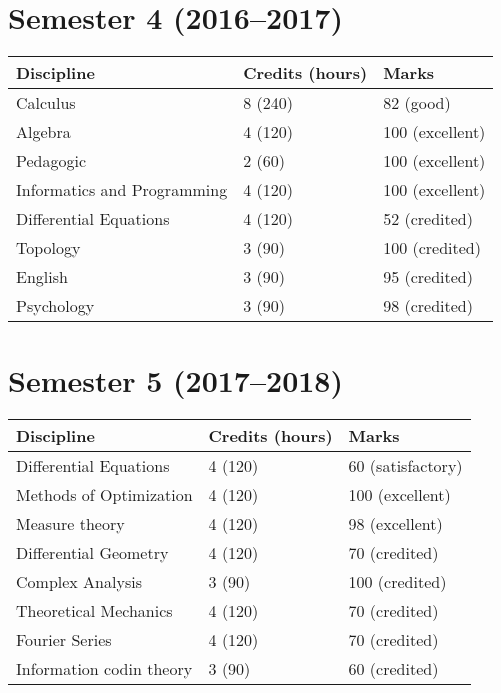 \documentclass[10pt]{extarticle}
\begin{document}

\section*{Semester 4 (2016--2017)}

\begin{tabularx}{\textwidth}{ | X | l | l | }

\hline
    \textbf{Discipline}              & \textbf{Credits (hours)} & \textbf{Marks} \\
\hline
    Calculus & 8 (240) & 82 (good) \\
    Algebra & 4 (120) & 100 (excellent) \\
    Pedagogic & 2 (60) & 100 (excellent) \\
    Informatics and Programming & 4 (120) & 100 (excellent) \\
\hline
    Differential Equations & 4 (120) & 52 (credited)  \\
    Topology               & 3 (90)  & 100 (credited) \\
    English                & 3 (90)  & 95 (credited)  \\
    Psychology             & 3 (90)  & 98 (credited)  \\
\hline

\end{tabularx}


\section*{Semester 5 (2017--2018)}

\begin{tabularx}{\textwidth}{ | X | l | l | }

\hline
    \textbf{Discipline}              & \textbf{Credits (hours)} & \textbf{Marks} \\
\hline
    Differential Equations  & 4 (120) & 60  (satisfactory) \\
    Methods of Optimization & 4 (120) & 100 (excellent)    \\
    Measure theory          & 4 (120) & 98  (excellent)    \\
\hline
    Differential Geometry    & 4 (120) & 70  (credited) \\
    Complex Analysis         & 3 (90)  & 100 (credited) \\
    Theoretical Mechanics    & 4 (120) & 70  (credited) \\
    Fourier Series           & 4 (120) & 70  (credited) \\
    Information codin theory & 3 (90)  & 60  (credited) \\
\hline

\end{tabularx}
\end{document}
